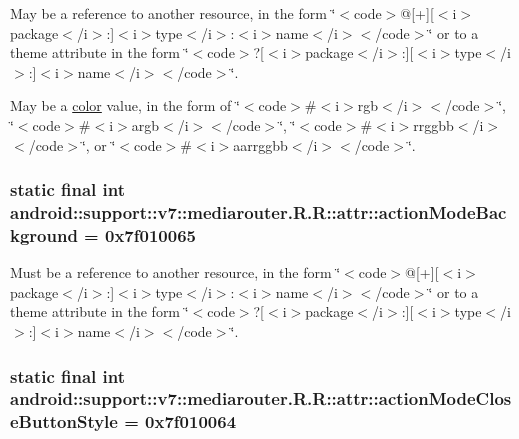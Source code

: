 May be a reference to another resource, in the form \char`\"{}$<$code$>$@\mbox{[}+\mbox{]}\mbox{[}$<$i$>$package$<$/i$>$:\mbox{]}$<$i$>$type$<$/i$>$:$<$i$>$name$<$/i$>$$<$/code$>$\char`\"{} or to a theme attribute in the form \char`\"{}$<$code$>$?\mbox{[}$<$i$>$package$<$/i$>$:\mbox{]}\mbox{[}$<$i$>$type$<$/i$>$:\mbox{]}$<$i$>$name$<$/i$>$$<$/code$>$\char`\"{}. 

May be a \hyperlink{classandroid_1_1support_1_1v7_1_1mediarouter_1_1_r_1_1color}{color} value, in the form of \char`\"{}$<$code$>$\#$<$i$>$rgb$<$/i$>$$<$/code$>$\char`\"{}, \char`\"{}$<$code$>$\#$<$i$>$argb$<$/i$>$$<$/code$>$\char`\"{}, \char`\"{}$<$code$>$\#$<$i$>$rrggbb$<$/i$>$$<$/code$>$\char`\"{}, or \char`\"{}$<$code$>$\#$<$i$>$aarrggbb$<$/i$>$$<$/code$>$\char`\"{}. \hypertarget{classandroid_1_1support_1_1v7_1_1mediarouter_1_1_r_1_1attr_ca2153d98da2f446eb363dcd14656639}{
\subsubsection[{actionModeBackground}]{\setlength{\rightskip}{0pt plus 5cm}static final int android::support::v7::mediarouter.R.R::attr::actionModeBackground = 0x7f010065}}
\label{classandroid_1_1support_1_1v7_1_1mediarouter_1_1_r_1_1attr_ca2153d98da2f446eb363dcd14656639}


Must be a reference to another resource, in the form \char`\"{}$<$code$>$@\mbox{[}+\mbox{]}\mbox{[}$<$i$>$package$<$/i$>$:\mbox{]}$<$i$>$type$<$/i$>$:$<$i$>$name$<$/i$>$$<$/code$>$\char`\"{} or to a theme attribute in the form \char`\"{}$<$code$>$?\mbox{[}$<$i$>$package$<$/i$>$:\mbox{]}\mbox{[}$<$i$>$type$<$/i$>$:\mbox{]}$<$i$>$name$<$/i$>$$<$/code$>$\char`\"{}. \hypertarget{classandroid_1_1support_1_1v7_1_1mediarouter_1_1_r_1_1attr_6ae0c850d551a4a5f5d128f65ae1aeed}{
\subsubsection[{actionModeCloseButtonStyle}]{\setlength{\rightskip}{0pt plus 5cm}static final int android::support::v7::mediarouter.R.R::attr::actionModeCloseButtonStyle = 0x7f010064}}
\label{classandroid_1_1support_1_1v7_1_1mediarouter_1_1_r_1_1attr_6ae0c850d551a4a5f5d128f65ae1aeed}



